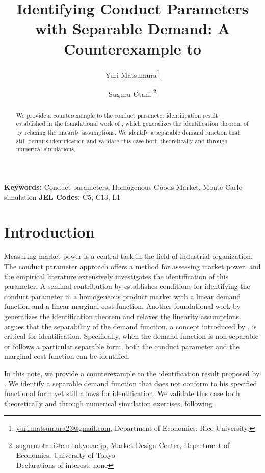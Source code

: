 \documentclass[11pt, a4paper]{article}
\title{Identifying Conduct Parameters with Separable Demand: A Counterexample to \cite{lau1982identifying}}
\author{Yuri Matsumura\thanks{\href{mailto:}{yuri.matsumura23@gmail.com}, Department of Economics, Rice University.} \and Suguru Otani \thanks{\href{mailto:}{suguru.otani@e.u-tokyo.ac.jp}, Market Design Center, Department of Economics, University of Tokyo
\\Declarations of interest: none %
}}
\theoremstyle{remark}
\begin{document}
\maketitle
\begin{abstract}
    We provide a counterexample to the conduct parameter identification result established in the foundational work of \citet{lau1982identifying}, which generalizes the identification theorem of \citet{bresnahan1982oligopoly} by relaxing the linearity assumptions. We identify a separable demand function that still permits identification and validate this case both theoretically and through numerical simulations.
\end{abstract}

\noindent\textbf{Keywords:} Conduct parameters, Homogenous Goods Market, Monte Carlo simulation
\vspace{0in}
\newline
\noindent\textbf{JEL Codes:} C5, C13, L1

\bigskip

\section{Introduction}

Measuring market power is a central task in the field of industrial organization. 
The conduct parameter approach offers a method for assessing market power, and the empirical literature extensively investigates the identification of this parameter.
A seminal contribution by \citet{bresnahan1982oligopoly} establishes conditions for identifying the conduct parameter in a homogeneous product market with a linear demand function and a linear marginal cost function. 
Another foundational work by \citet{lau1982identifying} generalizes the identification theorem and relaxes the linearity assumptions. 
\cite{lau1982identifying} argues that the separability of the demand function, a concept introduced by \citet{goldmanNote1964}, is critical for identification. 
Specifically, when the demand function is non-separable or follows a particular separable form, both the conduct parameter and the marginal cost function can be identified.

In this note, we provide a counterexample to the identification result proposed by \citet{lau1982identifying}. 
We identify a separable demand function that does not conform to his specified functional form yet still allows for identification. 
We validate this case both theoretically and through numerical simulation exercises, following \citet{matsumura2023resolving,matsumura2024challenges}.
\end{document}
